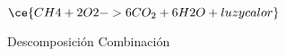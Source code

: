 $\ce{CH4 + 2O2 -> 6CO_2 + 6H2O +  luz y calor}$

\begin{oneparchoices}
    \choice Descomposición
    \choice Combinación
\end{oneparchoices}